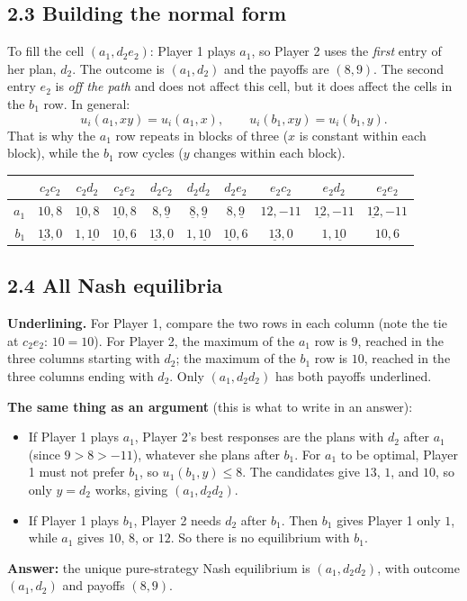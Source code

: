 \documentclass[11pt]{article}
\begin{document}
\subsection*{2.3 Building the normal form}
To fill the cell $(a_1, d_2e_2)$: Player 1 plays $a_1$, so Player 2 uses the \emph{first} entry of her plan, $d_2$. The outcome is $(a_1,d_2)$ and the payoffs are $(8,9)$. The second entry $e_2$ is \emph{off the path} and does not affect this cell, but it does affect the cells in the $b_1$ row. In general:
\[
u_i(a_1,xy)=u_i(a_1,x),\qquad u_i(b_1,xy)=u_i(b_1,y).
\]
That is why the $a_1$ row repeats in blocks of three ($x$ is constant within each block), while the $b_1$ row cycles ($y$ changes within each block).

\begin{center}
\small
\setlength{\tabcolsep}{4pt}
\begin{tabular}{r|ccccccccc}
 & $c_2c_2$ & $c_2d_2$ & $c_2e_2$ & $d_2c_2$ & $d_2d_2$ & $d_2e_2$ & $e_2c_2$ & $e_2d_2$ & $e_2e_2$ \\ \hline
$a_1$ & $10,8$ & $\underline{10},8$ & $\underline{10},8$ & $8,\underline{9}$ & $\underline{8},\underline{9}$ & $8,\underline{9}$ & $12,-11$ & $\underline{12},-11$ & $\underline{12},-11$ \\
$b_1$ & $\underline{13},0$ & $1,\underline{10}$ & $\underline{10},6$ & $\underline{13},0$ & $1,\underline{10}$ & $\underline{10},6$ & $\underline{13},0$ & $1,\underline{10}$ & $10,6$
\end{tabular}
\end{center}

\subsection*{2.4 All Nash equilibria}
\textbf{Underlining.} For Player 1, compare the two rows in each column (note the tie at $c_2e_2$: $10=10$). For Player 2, the maximum of the $a_1$ row is $9$, reached in the three columns starting with $d_2$; the maximum of the $b_1$ row is $10$, reached in the three columns ending with $d_2$. Only $(a_1,d_2d_2)$ has both payoffs underlined.

\textbf{The same thing as an argument} (this is what to write in an answer):
\begin{itemize}
\item If Player 1 plays $a_1$, Player 2's best responses are the plans with $d_2$ after $a_1$ (since $9>8>-11$), whatever she plans after $b_1$. For $a_1$ to be optimal, Player 1 must not prefer $b_1$, so $u_1(b_1,y)\le 8$. The candidates give $13$, $1$, and $10$, so only $y=d_2$ works, giving $(a_1,d_2d_2)$.
\item If Player 1 plays $b_1$, Player 2 needs $d_2$ after $b_1$. Then $b_1$ gives Player 1 only $1$, while $a_1$ gives $10$, $8$, or $12$. So there is no equilibrium with $b_1$.
\end{itemize}
\textbf{Answer:} the unique pure-strategy Nash equilibrium is $(a_1,d_2d_2)$, with outcome $(a_1,d_2)$ and payoffs $(8,9)$.
\end{document}
